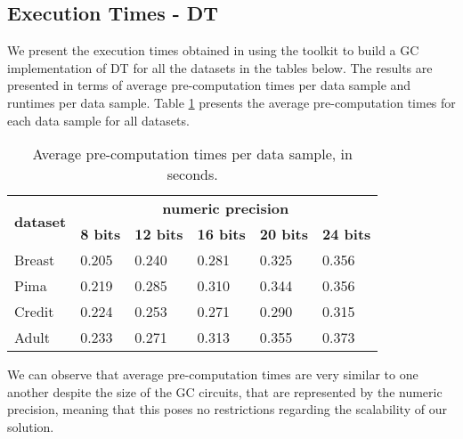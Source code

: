 \subsection{Execution Times - \acl{DT}}

We present the execution times obtained in using the toolkit to build a \ac{GC} implementation of \ac{DT} for all the datasets in the tables below. The results are presented in terms of average pre-computation times per data sample and runtimes per data sample. Table \ref{table:avgDTAllDatasets} presents the average pre-computation times for each data sample for all datasets.


\begin{table}[H]
\centering
\caption{Average pre-computation times per data sample, in seconds.}
\label{table:avgDTAllDatasets}
\begin{tabular}{|l|l|l|l|l|l|}
\hline
\multicolumn{1}{|c|}{\multirow{2}{*}{\textbf{dataset}}} & \multicolumn{5}{c|}{\textbf{numeric precision}}                                             \\ \cline{2-6} 
\multicolumn{1}{|c|}{}                                  & \textbf{8 bits} & \textbf{12 bits} & \textbf{16 bits} & \textbf{20 bits} & \textbf{24 bits} \\ \hline
Breast                                                  & 0.205           & 0.240            & 0.281            & 0.325            & 0.356            \\ \hline
Pima                                                    & 0.219           & 0.285            & 0.310            & 0.344            & 0.356            \\ \hline
Credit                                                  & 0.224           & 0.253            & 0.271            & 0.290            & 0.315            \\ \hline
Adult                                                   & 0.233           & 0.271            & 0.313            & 0.355            & 0.373            \\ \hline
\end{tabular}
\end{table}


We can observe that average pre-computation times are very similar to one another despite the size of the \ac{GC} circuits, that are represented by the numeric precision, meaning that this poses no restrictions regarding the scalability of our solution.

